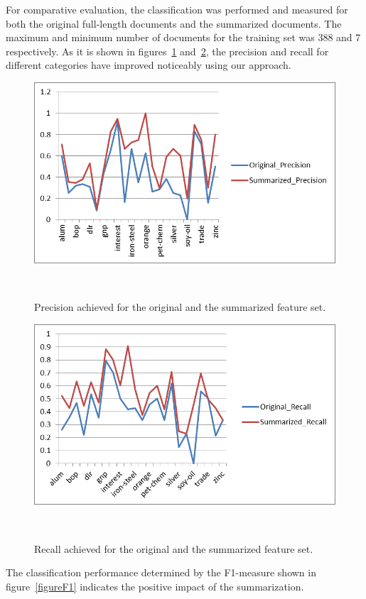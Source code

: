 \documentclass{sigchi}
\begin{document}
For comparative evaluation, the classification was performed and measured for both the original full-length documents and the summarized documents. 
The maximum and minimum number of documents for the training set was 388 and 7 respectively. 
As it is shown in figures~\ref{figurePrecision} and~\ref{figureRecall}, the precision and recall for different categories have improved noticeably using our approach. 
\begin{figure}
\centering
  \includegraphics[width=0.9\columnwidth]{figures/DocumentClassificationAzadehDorna-002}
  \caption{Precision achieved for the original and the summarized feature set. }~\label{figurePrecision}
\end{figure}
\begin{figure}
\centering
  \includegraphics[width=0.9\columnwidth]{figures/DocumentClassificationAzadehDorna-004}
  \caption{Recall achieved for the original and the summarized feature set.}~\label{figureRecall}
\end{figure}
The classification performance determined by the F1-measure shown in figure~\ref{figureF1} indicates the positive impact of the summarization.
\end{document}
